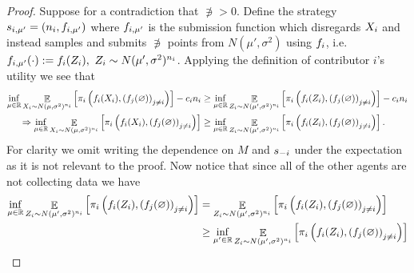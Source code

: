 \begin{proof}
    Suppose for a contradiction that $\nni>0$. Define the strategy $s_{i,\mu'}=\left(n_i,f_{i,\mu'}\right)$
    where $f_{i,\mu'}$ is the submission function which disregards $X_{i}$ and instead samples and submits $\nni$ points from $N(\mu',\sigma^2)$ using $f_i$, i.e. $f_{i,\mu'}(\cdot):=f_i(Z_i),~Z_i\sim N(\mu',\sigma^2)^{n_i}$.  
    Applying the definition of contributor $i$'s utility we see that
    \begin{align*}
        \inf_{\mu\in\mathbb{R}}
        \mathop{\mathbb{E}}_{
            X_{i}\sim N(\mu,\sigma^2)^{n_i}
        }
        \left[
            \pi_i\left(
                f_i(X_{i}), \left(f_j(\varnothing)\right)_{j\neq i}
            \right)
        \right]
        -c_in_i
        &\geq 
        \inf_{\mu\in\mathbb{R}}
        \mathop{\mathbb{E}}_{
            Z_i\sim N(\mu',\sigma^2)^{n_i}
        }
        \left[
            \pi_i\left(
                f_i(Z_i), \left(f_j(\varnothing)\right)_{j\neq i}
            \right)
        \right]
        -c_in_i
        \\
        \Rightarrow
        \inf_{\mu\in\mathbb{R}}
        \mathop{\mathbb{E}}_{
            X_{i}\sim N(\mu,\sigma^2)^{n_i}
        }
        \left[
            \pi_i\left(
                f_i(X_{i}), \left(f_j(\varnothing)\right)_{j\neq i}
            \right)
        \right]
        &\geq 
        \inf_{\mu\in\mathbb{R}}
        \mathop{\mathbb{E}}_{
            Z_i\sim N(\mu',\sigma^2)^{n_i}
        }
        \left[
            \pi_i\left(
                f_i(Z_i), \left(f_j(\varnothing)\right)_{j\neq i}
            \right)
        \right] .
    \end{align*}
    For clarity we omit writing the dependence on $M$ and $s_{-i}$ under the expectation as it is not relevant to the proof. Now notice that since all of the other agents are not collecting data we have
    \begin{align*}
        \inf_{\mu\in\mathbb{R}}
        \mathop{\mathbb{E}}_{
            Z_i\sim N(\mu',\sigma^2)^{n_i}
        }
        \left[
            \pi_i\left(
                f_i(Z_i), \left(f_j(\varnothing)\right)_{j\neq i}
            \right)
        \right]
        &=
        \mathop{\mathbb{E}}_{
            Z_i\sim N(\mu',\sigma^2)^{n_i}
        }
        \left[
            \pi_i\left(
                f_i(Z_i), \left(f_j(\varnothing)\right)_{j\neq i}
            \right)
        \right]
        \\
        &\geq
        \inf_{\mu'\in\mathbb{R}}
        \mathop{\mathbb{E}}_{
            Z_i\sim N(\mu',\sigma^2)^{n_i}
        }
        \left[
            \pi_i\left(
                f_i(Z_i), \left(f_j(\varnothing)\right)_{j\neq i}
\right)\right]
\end{align*}
\end{proof}
